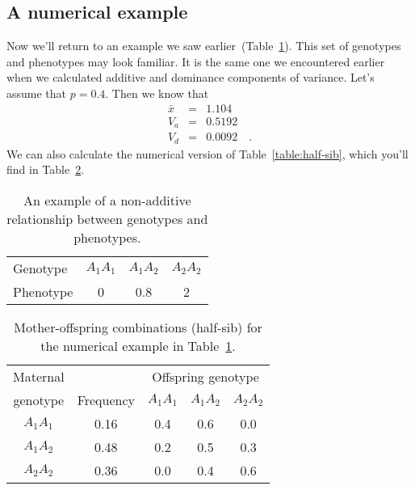 \documentclass[12pt]{article}
\begin{document}
\subsection*{A numerical example}

Now we'll return to an example we saw
earlier~(Table~\ref{table:example}). This set of genotypes and
phenotypes may look familiar. It is the same one we encountered
earlier when we calculated additive and dominance components of
variance. Let's assume that $p = 0.4$. Then we know that
\begin{eqnarray*}
\bar x &=& 1.104 \\
V_a &=& 0.5192 \\
V_d &=& 0.0092 \quad .
\end{eqnarray*}
We can also calculate the numerical version of
Table~\ref{table:half-sib}, which you'll find in
Table~\ref{table:example-hs}.

\begin{table}
\begin{center}
\begin{tabular}{l|ccc}
\hline\hline
Genotype  & $A_1A_1$ & $A_1A_2$ & $A_2A_2$ \\
Phenotype & 0        & 0.8      & 2 \\
\hline
\end{tabular}
\end{center}
\caption{An example of a non-additive relationship between genotypes
  and phenotypes.}\label{table:example}
\end{table}

\begin{table}
\begin{center}
\begin{tabular}{c|c|ccc}
\hline\hline
Maternal &           & \multicolumn{3}{c}{Offspring genotype} \\
genotype & Frequency & $A_1A_1$ & $A_1A_2$ & $A_2A_2$ \\
\hline
$A_1A_1$ & 0.16      & 0.4      & 0.6      & 0.0 \\
$A_1A_2$ & 0.48      & 0.2      & 0.5      & 0.3 \\
$A_2A_2$ & 0.36      & 0.0      & 0.4      & 0.6 \\
\hline
\end{tabular}
\end{center}
\caption{Mother-offspring combinations (half-sib) for the numerical
  example in Table~\ref{table:example}.}\label{table:example-hs}
\end{table}
\end{document}
